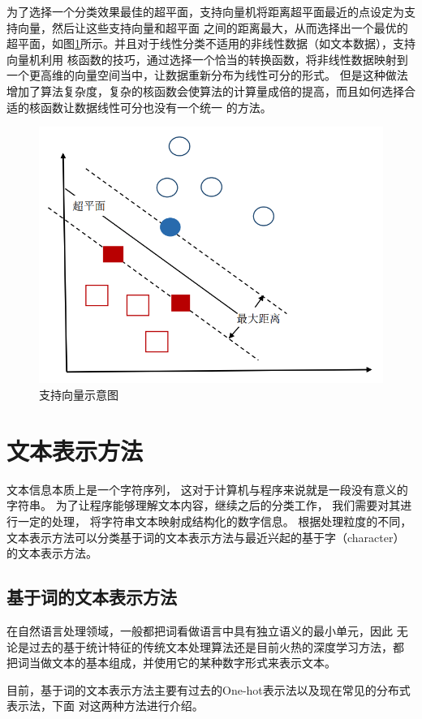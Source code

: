为了选择一个分类效果最佳的超平面，支持向量机将距离超平面最近的点设定为支持向量，然后让这些支持向量和超平面
之间的距离最大，从而选择出一个最优的超平面，如图\ref{svm}所示。并且对于线性分类不适用的非线性数据（如文本数据），支持向量机利用
核函数的技巧，通过选择一个恰当的转换函数，将非线性数据映射到一个更高维的向量空间当中，让数据重新分布为线性可分的形式。
但是这种做法增加了算法复杂度，复杂的核函数会使算法的计算量成倍的提高，而且如何选择合适的核函数让数据线性可分也没有一个统一
的方法。
\begin{figure}[h]
    \includegraphics[scale=0.35]{picture/svm.png}
    \caption{支持向量示意图}
    \label{svm}
\end{figure}
\fi
\section{文本表示方法}
文本信息本质上是一个字符序列，
这对于计算机与程序来说就是一段没有意义的字符串。
为了让程序能够理解文本内容，继续之后的分类工作，
我们需要对其进行一定的处理，
将字符串文本映射成结构化的数字信息。
根据处理粒度的不同，文本表示方法可以分类基于词的文本表示方法与最近兴起的基于字（character）
的文本表示方法。
\subsection{基于词的文本表示方法}
在自然语言处理领域，一般都把词看做语言中具有独立语义的最小单元，因此
无论是过去的基于统计特征的传统文本处理算法还是目前火热的深度学习方法，都
把词当做文本的基本组成，并使用它的某种数字形式来表示文本。

目前，基于词的文本表示方法主要有过去的One-hot表示法以及现在常见的分布式表示法，下面
对这两种方法进行介绍。

